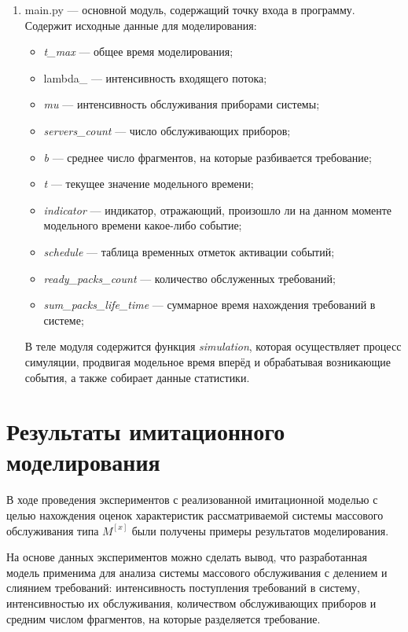 \documentclass[bachelor, och, pract, times]{SCWorks}
\begin{document}
\begin{enumerate}
\item main.py — основной модуль, содержащий точку входа в программу. Содержит исходные данные для моделирования:
\begin{itemize}
    \item \textit{t\_max} — общее время моделирования;
    \item {lambda\_} — интенсивность входящего потока;
    \item  \textit{mu} — интенсивность обслуживания приборами системы;
    \item \textit{servers\_count} — число обслуживающих приборов;
    \item \textit{b} — среднее число фрагментов, на которые разбивается требование;
    \item \textit{t} — текущее значение модельного времени;
    \item \textit{indicator} — индикатор, отражающий, произошло ли на данном моменте модельного времени какое-либо событие;
    \item \textit{schedule} — таблица временных отметок активации событий;
    \item \textit{ready\_packs\_count} — количество обслуженных требований;
    \item \textit{sum\_packs\_life\_time} — суммарное время нахождения требований в системе;
\end{itemize}
В теле модуля содержится функция \textit{simulation}, которая осуществляет процесс симуляции, продвигая модельное время вперёд и обрабатывая возникающие события, а также собирает данные статистики.
\end{enumerate}


\section{Результаты имитационного моделирования}

В ходе проведения экспериментов с реализованной имитационной моделью с целью нахождения оценок характеристик рассматриваемой системы массового обслуживания типа $M^{[x]}$ были получены примеры результатов моделирования.

На основе данных экспериментов можно сделать вывод, что разработанная модель применима для анализа системы массового обслуживания с делением и слиянием требований: интенсивность поступления требований в систему, интенсивностью их обслуживания, количеством обслуживающих приборов и средним числом фрагментов, на которые разделяется требование.
\end{document}
